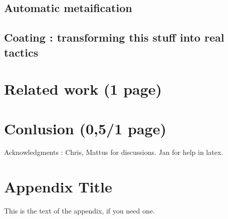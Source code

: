 \documentclass{sigplanconf}
\begin{document}
	\subsection {Automatic metaification}

	\subsection {Coating : transforming this stuff into real tactics}

\section {Related work (1 page)}

\section {Conlusion (0,5/1 page)}


\acks

Acknowledgments : Chris, Mattus for discussions. Jan for help in latex.





\appendix
\section{Appendix Title}

This is the text of the appendix, if you need one.
\end{document}
